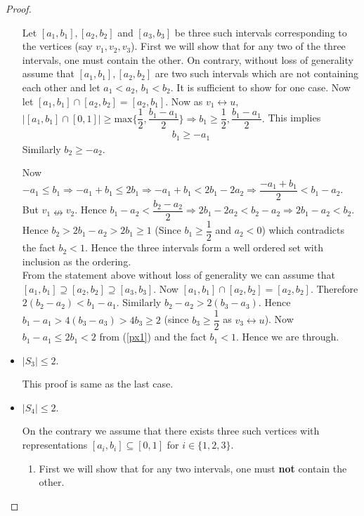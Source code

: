 \documentclass{article}
\theoremstyle{definition}
\numberwithin{equation}{section}
\begin{document}
\begin{proof}
\begin{itemize}
\vspace{.1em}
\noindent
\noindent Let $[a_{1},b_{1}],[a_{2},b_{2}]$ and $[a_{3},b_{3}]$ be three such intervals corresponding to the vertices (say $v_{1},v_{2},v_{3}$). First we will show that for any two of the three intervals, one must contain the other. On contrary, without loss of generality assume that $[a_{1},b_{1}],[a_{2},b_{2}]$ are two such intervals which are not containing each other and let $a_{1}<a_{2}$, $b_{1}<b_{2}$. It is sufficient to show for one case. Now let
$[a_{1},b_{1}]\cap [a_{2},b_{2}]=[a_{2},b_{1}]$. Now as $v_{1}\leftrightarrow u$, $|[a_{1},b_{1}]\cap[0,1]|\geq \text{max} \{\dfrac{1}{2},\dfrac{b_{1}-a_{1}}{2}\} \Rightarrow b_{1}\geq \dfrac{1}{2},\dfrac{b_{1}-a_{1}}{2}.$ This implies \begin{eqnarray}
\label{px1}
b_{1}\geq -a_{1}
\end{eqnarray}
Similarly $b_{2}\geq -a_{2}$.

\noindent Now $-a_{1}\leq b_{1}\Rightarrow -a_{1}+b_{1}\leq 2b_{1}\Rightarrow -a_{1}+b_{1}< 2b_{1}-2a_{2}\Rightarrow \dfrac{-a_{1}+b_{1}}{2}< b_{1}-a_{2}$. But $v_{1}\nleftrightarrow v_{2}$. Hence $b_{1}-a_{2}<\dfrac{b_{2}-a_{2}}{2}\Rightarrow 2b_{1}-2a_{2}<b_{2}-a_{2}\Rightarrow 2b_{1}-a_{2}<b_{2}.$ Hence $b_{2}>2b_{1}-a_{2}>2b_{1}\geq 1$ (Since $b_{1}\geq \dfrac{1}{2}$ and $a_{2}<0$) which contradicts the fact $b_{2}<1.$ Hence the three intervals form a well ordered set with inclusion as the ordering. \\
From the statement above without loss of generality we can assume that $[a_{1},b_{1}] \supseteq [a_{2},b_{2}]\supseteq [a_{3},b_{3}]$.
\vspace{.1 cm}
\noindent Now $[a_{1},b_{1}]\cap [a_{2},b_{2}]=[a_{2},b_{2}]$. Therefore $2(b_{2}-a_{2})<b_{1}-a_{1}$. Similarly $b_{2}-a_{2}>2(b_{3}-a_{3}).$ Hence $b_{1}-a_{1}>4(b_{3}-a_{3})>4b_{3}\geq 2$ (since $b_{3}\geq\dfrac{1}{2}$ as $v_{3}\leftrightarrow u$). Now $b_{1}-a_{1}\leq 2b_{1}< 2$ from (\ref{px1}) and the fact $b_{1}<1.$ Hence we are through.

\item $|S_{3}|\leq 2$.

\noindent This proof is same as the last case.

\item $|S_{4}|\leq 2$.

\noindent On the contrary we assume that there exists three such vertices with representations  $[a_{i},b_{i}]\subseteq [0,1]$ for $i\in \{1,2,3\}$.

\begin{enumerate}
\item First we will show that for any two intervals, one must \textbf{not} contain the other.
\vspace{0.1em}


\end{enumerate}
\end{itemize}
\end{proof}
\end{document}
